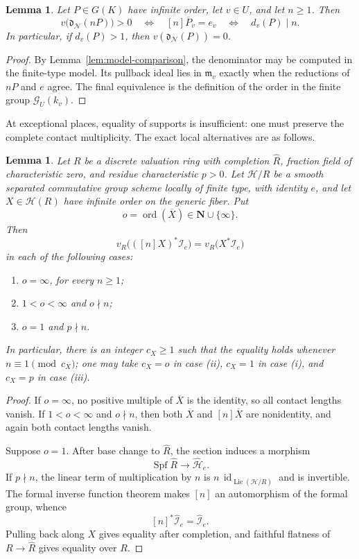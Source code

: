 \documentclass[11pt,letterpaper,reqno]{amsart}
\newtheorem{lemma}[theorem]{Lemma}
\theoremstyle{definition}
\theoremstyle{remark}
\newcommand{\N}{\mathbf N}
\newcommand{\ord}{\operatorname{ord}}
\newcommand{\Spf}{\operatorname{Spf}}
\newcommand{\id}{\operatorname{id}}
\newcommand{\dd}{\mathfrak d}
\newcommand{\Ner}{\mathcal N}
\DeclareMathOperator{\Lie}{Lie}
\begin{document}
\begin{lemma}\label{lem:reduction-criterion}
Let $P\in G(K)$ have infinite order, let $v\in U$, and let $n\ge1$.  Then
\[
 v\bigl(\dd_{\Ner}(nP)\bigr)>0
 \quad\Longleftrightarrow\quad
 [n]\overline P_v=e_v
 \quad\Longleftrightarrow\quad
 d_v(P)\mid n.
\]
In particular, if $d_v(P)>1$, then $v(\dd_{\Ner}(P))=0$.
\end{lemma}

\begin{proof}
By Lemma~\ref{lem:model-comparison}, the denominator may be computed in the
finite-type model.  Its pullback ideal lies in $\mathfrak m_v$ exactly when the
reductions of $nP$ and $e$ agree.  The final equivalence is the definition of
the order in the finite group $\mathcal G_U(k_v)$.
\end{proof}

At exceptional places, equality of supports is insufficient: one must preserve the complete contact multiplicity.  The exact local alternatives are as follows.

\begin{lemma}\label{lem:local-freezing}
Let $R$ be a discrete valuation ring with completion $\widehat R$, fraction
field of characteristic zero, and residue characteristic $p>0$.  Let
$\mathcal H/R$ be a smooth separated commutative group scheme locally of
finite type, with identity $e$, and let $X\in\mathcal H(R)$ have infinite
order on the generic fiber.  Put
\[
 o=\ord(\overline X)\in\N\cup\{\infty\}.
\]
Then
\[
 v_R\bigl(([n]X)^*\mathcal I_e\bigr)
 =v_R\bigl(X^*\mathcal I_e\bigr)
\]
in each of the following cases:
\begin{enumerate}[label=\textup{(\roman*)}]
\item $o=\infty$, for every $n\ge1$;
\item $1<o<\infty$ and $o\nmid n$;
\item $o=1$ and $p\nmid n$.
\end{enumerate}
In particular, there is an integer $c_X\ge1$ such that the equality holds
whenever $n\equiv1\pmod{c_X}$; one may take $c_X=o$ in case (ii), $c_X=1$ in
case (i), and $c_X=p$ in case (iii).
\end{lemma}

\begin{proof}
If $o=\infty$, no positive multiple of $\overline X$ is the identity, so all
contact lengths vanish.  If $1<o<\infty$ and $o\nmid n$, then both
$\overline X$ and $[n]\overline X$ are nonidentity, and again both contact
lengths vanish.

Suppose $o=1$.  After base change to $\widehat R$, the section induces a
morphism
\[
 \Spf\widehat R\longrightarrow\widehat{\mathcal H}_e.
\]
If $p\nmid n$, the linear term of multiplication by $n$ is
$n\,\id_{\Lie(\mathcal H/R)}$ and is invertible.  The formal inverse function
theorem makes $[n]$ an automorphism of the formal group, whence
\[
 [n]^*\widehat{\mathcal I}_e=\widehat{\mathcal I}_e.
\]
Pulling back along $X$ gives equality after completion, and faithful flatness
of $R\to\widehat R$ gives equality over $R$.
\end{proof}
\end{document}
